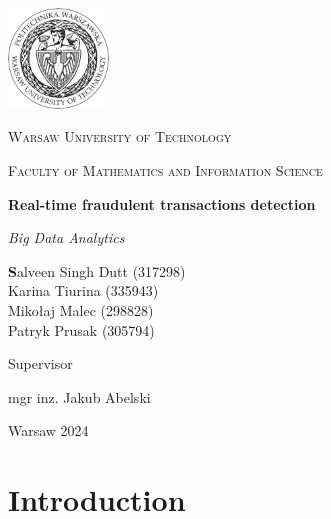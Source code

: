 \documentclass[12pt,a4paper, hidelinks]{article}
\begin{document}
\begin{titlepage}
    \centering
    \vspace*{0.5 cm}
    \includegraphics[width=0.20\textwidth]{images/logo.png}\par\vspace{1cm}
    {\scshape\LARGE Warsaw University of Technology \par}
    \vspace{1cm}
    {\scshape\Large Faculty of Mathematics and Information Science\par}
    \vspace{1.5cm}
    {\huge\bfseries Real-time fraudulent transactions detection \par}
    \vspace{1cm}
    {\Large\itshape Big Data Analytics\par}
    \vfill
    \begin{flushright}

    {\Large\textbf Salveen Singh Dutt (317298) \\ Karina Tiurina (335943) \\ Mikołaj Malec (298828) \\ Patryk Prusak (305794) \par}
    \vfill
    {Supervisor\par}
    {\Large mgr inz. Jakub Abelski \par}
    
    \end{flushright}
    \vfill
    {\large Warsaw 2024\par}
    \vspace{1cm}
\end{titlepage}

\newpage

\tableofcontents
\newpage %

\section*{Introduction}
\vspace{\baselineskip} %
\end{document}
